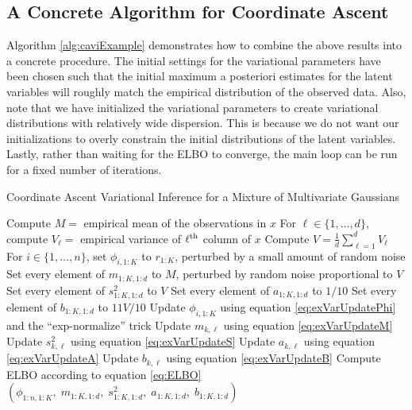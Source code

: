 \documentclass[11pt]{article}
\begin{document}
\clearpage
\subsection{A Concrete Algorithm for Coordinate Ascent}

Algorithm \ref{alg:caviExample} demonstrates how to combine the above results into a concrete procedure.
The initial settings for the variational parameters have been chosen such that the initial maximum a posteriori estimates for the latent variables will roughly match the empirical distribution of the observed data.
Also, note that we have initialized the variational parameters to create variational distributions with relatively wide dispersion.
This is because we do not want our initializations to overly constrain the initial distributions of the latent variables.
Lastly, rather than waiting for the ELBO to converge, the main loop can be run for a fixed number of iterations.

\begin{algorithm}[!ht]
\caption{Coordinate Ascent Variational Inference for a Mixture of Multivariate Gaussians}
\label{alg:caviExample}
\begin{algorithmic}
    \State Compute $M = $ empirical mean of the observations in $x$
    \State For $\ell \in \{1, \ldots, d\}$, compute $V_\ell = $ empirical variance of $\ell^{\mathrm{th}}$ column of $x$
    \State Compute $V = \frac{1}{d} \sum_{\ell=1}^d V_\ell$
    \State For $i \in \{1, \ldots, n\}$, set $\phi_{i,1:K}$ to $r_{1:K}$, perturbed by a small amount of random noise
    \State Set every element of $m_{1:K,1:d}$ to $M$, perturbed by random noise proportional to $V$
    \State Set every element of $s_{1:K,1:d}^2$ to $V$
    \State Set every element of $a_{1:K,1:d}$ to $1/10$
    \State Set every element of $b_{1:K,1:d}$ to $11 V / 10$
            \State Update $\phi_{i,1:K}$ using equation \eqref{eq:exVarUpdatePhi} and the ``exp-normalize'' trick
        \EndFor
                \State Update $m_{k,\ell}$ using equation \eqref{eq:exVarUpdateM}
                \State Update $s_{k,\ell}^2$ using equation \eqref{eq:exVarUpdateS}
                \State Update $a_{k,\ell}$ using equation \eqref{eq:exVarUpdateA}
                \State Update $b_{k,\ell}$ using equation \eqref{eq:exVarUpdateB}
            \EndFor
        \EndFor
        \State Compute ELBO according to equation \eqref{eq:ELBO}
    \EndWhile
    \State \Return $(\phi_{1:n,1:K}, \;
                     m_{1:K,1:d}, \;
                     s_{1:K,1:d}^2, \;
                     a_{1:K,1:d}, \;
                     b_{1:K,1:d})$
\EndFunction
\end{algorithmic}
\end{algorithm}
\end{document}
